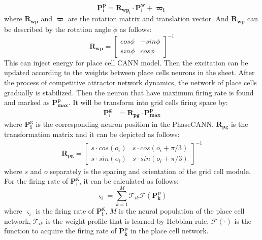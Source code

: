 \documentclass[preprint,12pt]{elsarticle}
\begin{document}
\begin{equation}\label{eq:worldframe2pcframe} 
	\boldsymbol{P^p_i} = \boldsymbol{R_{wp_i}}\cdot \boldsymbol{P^w_i} + \boldsymbol{\varpi_i}
\end{equation}	
where $\boldsymbol{R_{wp}}$ and $\boldsymbol{\varpi}$ are the rotation matrix and translation vector. And $\boldsymbol{R_{wp}}$ can be described by the rotation angle $\phi$ as follows:
\begin{equation}\label{eq:rotation_matrix}
	\boldsymbol{R_{wp}} =
	\begin{bmatrix}
		cos\phi& -sin\phi\\
		sin\phi& cos\phi
	\end{bmatrix}^{-1}
\end{equation}
This can inject energy for place cell CANN model. Then the excitation can be updated according to the weights between place cells neurons in the sheet\cite{McNaughton2006c}. After the process of competitive attractor network dynamics, the network of place cells gradually is stabilized. Then the neuron that have maximum firing rate is found and marked as $\boldsymbol{P^p_\text{max}}$. It will be transform into grid cells firing space by:
\begin{align}\label{eq:cal_position}
	\bm{P^g_i} &= \bm{R_{pg}}\cdot \bm{P^p_\text{max}} 
\end{align}
where $\boldsymbol{P^g_i}$ is the corresponding neuron position in the PhaseCANN, $\boldsymbol{R_{pg}}$ is the transformation matrix and it can be depicted as follows:
\begin{align}
	\boldsymbol{R_{pg}} =
	\begin{bmatrix}
		s\cdot cos(o_i)& s\cdot cos(o_i+\pi/3)\\
		s\cdot sin(o_i)& s\cdot sin(o_i+\pi/3)
	\end{bmatrix}^{-1}
\end{align}
where $s$ and $o$ separately is the spacing and orientation of the grid cell module. For the firing rate of $\bm{P^g_i}$, it can be calculated as follows:
\begin{equation}\label{eq:cal_rate}
	\varsigma_i = \sum_{k=1}^{M} \mathcal{T}_{ik} \mathcal{F}(\bm{P^p_k})
\end{equation}
where $\varsigma_i$ is the firing rate of $\bm{P^g_i}$, $M$ is the neural population of the place cell network, $\mathcal{T}_{ik}$ is the weight profile that is learned by Hebbian rule, $\mathcal{F}(\cdot)$ is the function to acquire the firing rate of $\bm{P^p_k}$ in the place cell network.
\end{document}

